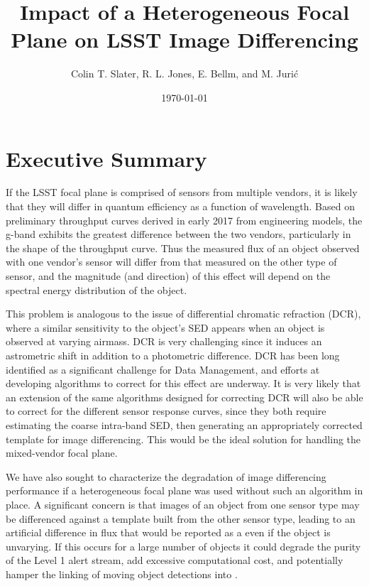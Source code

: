 \documentclass[DM]{lsstdoc}
\title[Heterogeneous Focal Plane]{Impact of a Heterogeneous Focal Plane on LSST Image Differencing}
\author{Colin T. Slater, R. L. Jones, E. Bellm, and M. Juri\'c}
\date{\today}
\begin{document}
\maketitle
{}


\section{Executive Summary}

If the LSST focal plane is comprised of sensors from multiple vendors, it is
likely that they will differ in quantum efficiency as a function of wavelength.
Based on preliminary throughput curves derived in early 2017 from engineering
models, the g-band exhibits the greatest difference between the two vendors,
particularly in the shape of the throughput curve. Thus the measured flux of an
object observed with one vendor's sensor will differ from that measured on the
other type of sensor, and the magnitude (and direction) of this effect will
depend on the spectral energy distribution of the object.

This problem is analogous to the issue of differential chromatic refraction (DCR),
where a similar sensitivity to the object's SED appears when an object is
observed at varying airmass. DCR is very challenging since it induces an
astrometric shift in addition to a photometric difference. DCR has been long
identified as a significant challenge for Data Management, and efforts at
developing algorithms to correct for this effect are underway. It is very likely
that an extension of the same algorithms designed for correcting DCR will also
be able to correct for the different sensor response curves, since they both
require estimating the coarse intra-band SED, then generating an appropriately
corrected template for image differencing. This would be the ideal solution for
handling the mixed-vendor focal plane.

We have also sought to characterize the degradation of image differencing
performance if a heterogeneous focal plane was used without such an algorithm in place.
A significant concern is that images of an object from one sensor type may be
differenced against a template built from the other sensor type, leading to an
artificial difference in flux that would be reported as a \DIASource even if the
object is unvarying. If this occurs for a large number of objects it could
degrade the purity of the Level 1 alert stream, add excessive computational
cost, and potentially hamper the linking of moving object detections into
\SSObjects.
\end{document}
